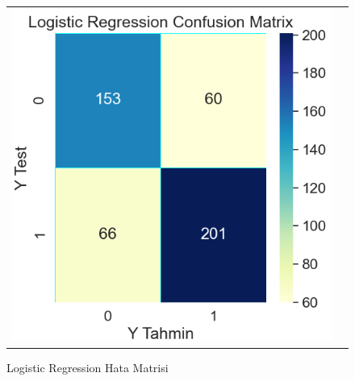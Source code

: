 \documentclass[conference]{IEEEtran}
\begin{document}
\begin{figure}[!h]
	\centering
	\begin{center}
		\begin{tabular}{cc}
			\includegraphics[scale=0.4]{pictures/pic_11.png}&
		\end{tabular}
	\end{center}
	\caption{Logistic Regression Hata Matrisi}
	\label{fig:11}
\end{figure}
\end{document}
